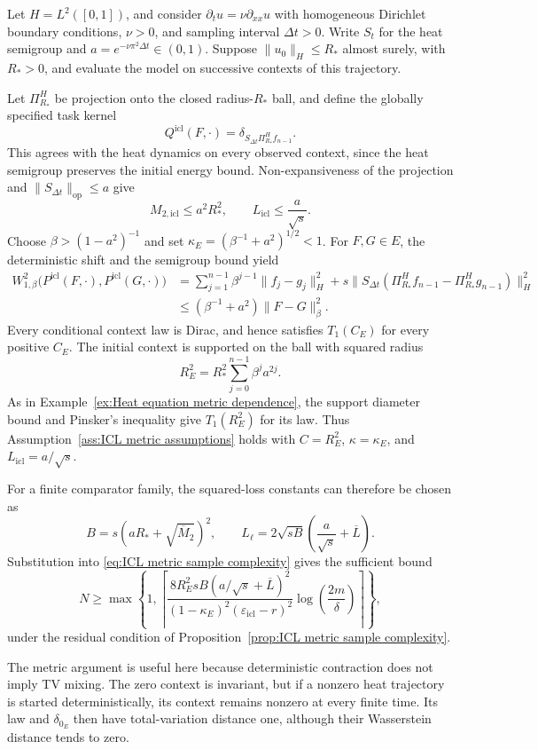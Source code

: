 \begin{example}
\label{ex:ICL heat equation}
Let \(H=L^2([0,1])\), and consider \(\partial_tu=\nu\partial_{xx}u\) with homogeneous Dirichlet boundary conditions, \(\nu>0\), and sampling interval \(\Delta t>0\). Write \(S_t\) for the heat semigroup and \(a=e^{-\nu\pi^2\Delta t}\in(0,1)\). Suppose \(\|u_0\|_H\leqslant R_*\) almost surely, with \(R_*>0\), and evaluate the model on successive contexts of this trajectory.

Let \(\Pi_{R_*}^H\) be projection onto the closed radius-\(R_*\) ball, and define the globally specified task kernel
\[
Q^{\mathrm{icl}}(F,\cdot)=\delta_{S_{\Delta t}\Pi_{R_*}^Hf_{n-1}}.
\]
This agrees with the heat dynamics on every observed context, since the heat semigroup preserves the initial energy bound. Non-expansiveness of the projection and \(\|S_{\Delta t}\|_{\mathrm{op}}\leqslant a\) give
\[
M_{2,\mathrm{icl}}\leqslant a^2R_*^2,
\qquad L_{\mathrm{icl}}\leqslant\frac{a}{\sqrt s}.
\]
Choose \(\beta>(1-a^2)^{-1}\) and set \(\kappa_E=(\beta^{-1}+a^2)^{1/2}<1\). For \(F,G\in E\), the deterministic shift and the semigroup bound yield
\[
\begin{aligned}
W_{1,\beta}^2\bigl(P^{\mathrm{icl}}(F,\cdot),P^{\mathrm{icl}}(G,\cdot)\bigr)
&=\sum_{j=1}^{n-1}\beta^{j-1}\|f_j-g_j\|_H^2
+s\|S_{\Delta t}(\Pi_{R_*}^Hf_{n-1}-\Pi_{R_*}^Hg_{n-1})\|_H^2\\
&\leqslant(\beta^{-1}+a^2)\|F-G\|_\beta^2.
\end{aligned}
\]
Every conditional context law is Dirac, and hence satisfies \(T_1(C_E)\) for every positive \(C_E\). The initial context is supported on the ball with squared radius
\[
R_E^2=R_*^2\sum_{j=0}^{n-1}\beta^ja^{2j}.
\]
As in Example~\ref{ex:Heat equation metric dependence}, the support diameter bound and Pinsker's inequality give \(T_1(R_E^2)\) for its law. Thus Assumption~\ref{ass:ICL metric assumptions} holds with \(C=R_E^2\), \(\kappa=\kappa_E\), and \(L_{\mathrm{icl}}=a/\sqrt s\).

For a finite comparator family, the squared-loss constants can therefore be chosen as
\[
B=s(aR_*+\sqrt{\overline M_2})^2,
\qquad L_\ell=2\sqrt{sB}\left(\frac{a}{\sqrt s}+\overline L\right).
\]
Substitution into \eqref{eq:ICL metric sample complexity} gives the sufficient bound
\[
N\geqslant\max\left\{1,\left\lceil
\frac{8R_E^2sB(a/\sqrt s+\overline L)^2}
{(1-\kappa_E)^2(\varepsilon_{\mathrm{icl}}-r)^2}
\log\left(\frac{2m}{\delta}\right)\right\rceil\right\},
\]
under the residual condition of Proposition~\ref{prop:ICL metric sample complexity}.

The metric argument is useful here because deterministic contraction does not imply TV mixing. The zero context is invariant, but if a nonzero heat trajectory is started deterministically, its context remains nonzero at every finite time. Its law and \(\delta_{0_E}\) then have total-variation distance one, although their Wasserstein distance tends to zero.
\end{example}

